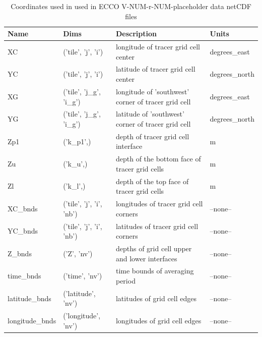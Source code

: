 \begin{longtable}{|p{}|p{}|p{}|p{}|}
\caption{Coordinates used in used in ECCO V-NUM-r-NUM-placeholder data netCDF files}
\label{tab:variable-attributes} \\ 
\hline \endfirsthead
\endhead
\endfoot
\hline \endlastfoot
\rowcolor{blue!25} \textbf{Name} & \textbf{Dims} & \textbf{Description} & \textbf{Units} \\ \hline
\rowcolor{magenta!25}
XC & ('tile', 'j', 'i') & longitude of tracer grid cell center & degrees\_east \\ \hline
\rowcolor{magenta!25}
YC & ('tile', 'j', 'i') & latitude of tracer grid cell center & degrees\_north \\ \hline
\rowcolor{magenta!25}
XG & ('tile', 'j\_g', 'i\_g') & longitude of 'southwest' corner of tracer grid cell & degrees\_east \\ \hline
\rowcolor{magenta!25}
YG & ('tile', 'j\_g', 'i\_g') & latitude of 'southwest' corner of tracer grid cell & degrees\_north \\ \hline
\rowcolor{magenta!25}
Zp1 & ('k\_p1',) & depth of tracer grid cell interface & m \\ \hline
\rowcolor{magenta!25}
Zu & ('k\_u',) & depth of the bottom face of tracer grid cells & m \\ \hline
\rowcolor{magenta!25}
Zl & ('k\_l',) & depth of the top face of tracer grid cells & m \\ \hline
\rowcolor{magenta!25}
XC\_bnds & ('tile', 'j', 'i', 'nb') & longitudes of tracer grid cell corners & --none-- \\ \hline
\rowcolor{magenta!25}
YC\_bnds & ('tile', 'j', 'i', 'nb') & latitudes of tracer grid cell corners & --none-- \\ \hline
\rowcolor{magenta!25}
Z\_bnds & ('Z', 'nv') & depths of grid cell upper and lower interfaces & --none-- \\ \hline
\rowcolor{magenta!25}
time\_bnds & ('time', 'nv') & time bounds of averaging period & --none-- \\ \hline
\rowcolor{magenta!25}
latitude\_bnds & ('latitude', 'nv') & latitudes of grid cell edges & --none-- \\ \hline
\rowcolor{magenta!25}
longitude\_bnds & ('longitude', 'nv') & longitudes of grid cell edges & --none-- \\ \hline
\end{longtable}
